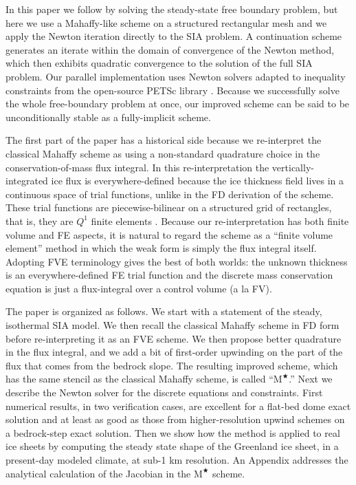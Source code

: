 \documentclass[twocolumn,letterpaper]{igs}
\newcommand{\Mstar}{$\text{M}^{\bigstar}$\xspace}
\begin{document}
In this paper we follow \cite{JouvetBueler2012} by solving the steady-state free boundary problem, but here we use a Mahaffy-like scheme on a structured rectangular mesh and we apply the Newton iteration directly to the SIA problem.  A continuation scheme generates an iterate within the domain of convergence of the Newton method, which then exhibits quadratic convergence to the solution of the full SIA problem.  Our parallel implementation uses Newton solvers adapted to inequality constraints from the open-source PETSc library \citep{Balayetal2014,BensonMunson2006}.  Because we successfully solve the whole free-boundary problem at once, our improved scheme can be said to be unconditionally stable as a fully-implicit scheme.

The first part of the paper has a historical side because we re-interpret the classical Mahaffy scheme as using a non-standard quadrature choice in the conservation-of-mass flux integral.  In this re-interpretation the vertically-integrated ice flux is everywhere-defined because the ice thickness field lives in a continuous space of trial functions, unlike in the FD derivation of the scheme.  These trial functions are piecewise-bilinear on a structured grid of rectangles, that is, they are $Q^1$ finite elements \citep{Elmanetal2005}.  Because our re-interpretation has both finite volume \citep[FV;][]{LeVeque2002} and FE aspects, it is natural to regard the scheme as a ``finite volume element'' \citep[FVE;][]{Cai1990,EwingLinLin2002} method in which the weak form is simply the flux integral itself.  Adopting FVE terminology gives the best of both worlds: the unknown thickness is an everywhere-defined FE trial function and the discrete mass conservation equation is just a flux-integral over a control volume (a la FV).

The paper is organized as follows.  We start with a statement of the steady, isothermal SIA model.  We then recall the classical Mahaffy scheme in FD form before re-interpreting it as an FVE scheme.  We then propose better quadrature in the flux integral, and we add a bit of first-order upwinding on the part of the flux that comes from the bedrock slope.  The resulting improved scheme, which has the same stencil as the classical Mahaffy scheme, is called ``\Mstar.''  Next we describe the Newton solver for the discrete equations and constraints.  First numerical results, in two verification cases, are excellent for a flat-bed dome exact solution and at least as good as those from higher-resolution upwind schemes on a bedrock-step exact solution.  Then we show how the method is applied to real ice sheets by computing the steady state shape of the Greenland ice sheet, in a present-day modeled climate, at sub-1 km resolution.  An Appendix addresses the analytical calculation of the Jacobian in the \Mstar scheme.
\end{document}
